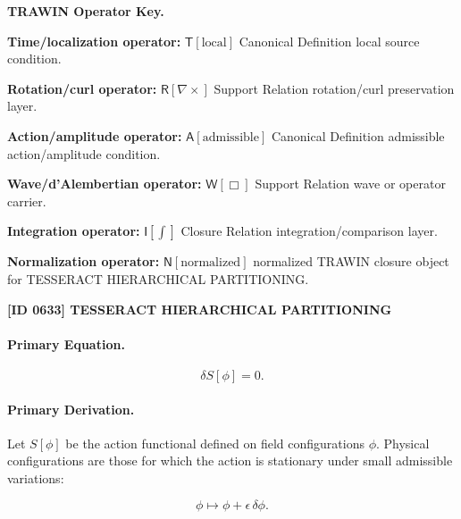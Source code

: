 \par\vspace{0.45\baselineskip}
\noindent\begin{minipage}[t]{\linewidth}
\begingroup
\small
\raggedright
\textbf{TRAWIN Operator Key.}\par
\noindent\textbf{Time/localization operator:} $\mathsf{T}\!\left[\mathrm{local}\right]$ Canonical Definition local source condition.\par
\noindent\textbf{Rotation/curl operator:} $\mathsf{R}\!\left[\nabla\times\right]$ Support Relation rotation/curl preservation layer.\par
\noindent\textbf{Action/amplitude operator:} $\mathsf{A}\!\left[\mathrm{admissible}\right]$ Canonical Definition admissible action/amplitude condition.\par
\noindent\textbf{Wave/d'Alembertian operator:} $\mathsf{W}\!\left[\Box\right]$ Support Relation wave or operator carrier.\par
\noindent\textbf{Integration operator:} $\mathsf{I}\!\left[\int\right]$ Closure Relation integration/comparison layer.\par
\noindent\textbf{Normalization operator:} $\mathsf{N}\!\left[\mathrm{normalized}\right]$ normalized TRAWIN closure object for TESSERACT HIERARCHICAL PARTITIONING.\par
\endgroup
\end{minipage}

\clearpage
\noindent\textbf{[ID 0633] TESSERACT HIERARCHICAL PARTITIONING}\par
\vspace{0.35em}
\paragraph{Primary Equation.}
\begin{equation}
\delta S[\phi]=0 .
\end{equation}

\paragraph{Primary Derivation.}
Let $S[\phi]$ be the action functional defined on field configurations $\phi$.  
Physical configurations are those for which the action is stationary under small admissible variations:

\begin{equation}
\phi \mapsto \phi+\epsilon\,\delta\phi .
\end{equation}

